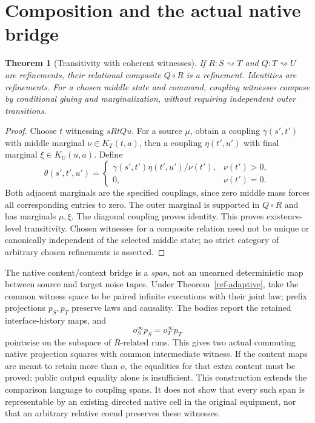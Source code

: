\documentclass[11pt]{article}
\newtheorem{theorem}{Theorem}\newtheorem{proposition}{Proposition}\newtheorem{corollary}{Corollary}\newtheorem{definition}{Definition}
\begin{document}
\section{Composition and the actual native bridge}
\begin{theorem}[Transitivity with coherent witnesses]
If $R:S\rightsquigarrow T$ and $Q:T\rightsquigarrow U$ are refinements, their relational composite $Q\circ R$ is a refinement. Identities are refinements. For a chosen middle state and command, coupling witnesses compose by conditional gluing and marginalization, without requiring independent outer transitions.
\end{theorem}
\begin{proof}
Choose $t$ witnessing $sRtQu$. For a source $\mu$, obtain a coupling $\gamma(s',t')$ with middle marginal $\nu\in K_T(t,a)$, then a coupling $\eta(t',u')$ with final marginal $\xi\in K_U(u,a)$. Define
\[
 \theta(s',t',u')=\begin{cases}\gamma(s',t')\eta(t',u')/\nu(t'),&\nu(t')>0,\\0,&\nu(t')=0.\end{cases}
\]
Both adjacent marginals are the specified couplings, since zero middle mass forces all corresponding entries to zero. The outer marginal is supported in $Q\circ R$ and has marginals $\mu,\xi$. The diagonal coupling proves identity. This proves existence-level transitivity. Chosen witnesses for a composite relation need not be unique or canonically independent of the selected middle state; no strict category of arbitrary chosen refinements is asserted.
\end{proof}

The native content/context bridge is a \emph{span}, not an unearned deterministic map between source and target noise tapes. Under Theorem~\ref{ref-adaptive}, take the common witness space to be paired infinite executions with their joint law; prefix projections $p_S,p_T$ preserve laws and causality. The bodies report the retained interface-history maps, and
\[
 o_S^{\infty}p_S=o_T^{\infty}p_T
\]
pointwise on the subspace of $R$-related runs. This gives two actual commuting native projection squares with common intermediate witness. If the content maps are meant to retain more than $o$, the equalities for that extra content must be proved; public output equality alone is insufficient. This construction extends the comparison language to coupling spans. It does not show that every such span is representable by an existing directed native cell in the original equipment, nor that an arbitrary relative coend preserves these witnesses.
\end{document}
